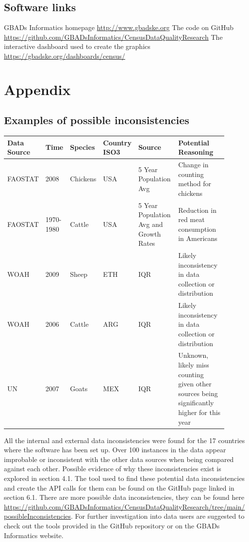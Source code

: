 \documentclass{article}
\begin{document}
\subsection{Software links}
GBADs Informatics homepage \url{http://www.gbadske.org}
\newline
The code on GitHub \url{https://github.com/GBADsInformatics/CensusDataQualityResearch}
\newline
The interactive dashboard used to create the graphics
\url{https://gbadske.org/dashboards/census/}

\section{Appendix}
\subsection{Examples of possible inconsistencies}
\begin{center}
\begin{longtable}[c]{| p{0.1\linewidth} | | p{0.1\linewidth} | | p{0.1\linewidth} | | p{0.1\linewidth} | | p{0.2\linewidth} | | p{0.3\linewidth} |}
\hline
Data Source & Time & Species & Country ISO3 & Source & Potential Reasoning\\
\hline
\endfirsthead

FAOSTAT & 2008          & Chickens  & USA & 5 Year Population Avg & Change in counting method for chickens \\
FAOSTAT & 1970-1980     & Cattle    & USA & 5 Year Population Avg and Growth Rates & Reduction in red meat consumption in Americans \\
WOAH    & 2009          & Sheep     & ETH & IQR & Likely inconsistency in data collection or distribution \\
WOAH    & 2006          & Cattle    & ARG & IQR & Likely inconsistency in data collection or distribution \\
UN      & 2007          & Goats     & MEX & IQR & Unknown, likely miss counting given other sources being significantly higher for this year \\

\hline
\end{longtable}
\end{center}

All the internal and external data inconsistencies were found for the 17 countries where the software has been set up. Over 100 instances in the data appear improbable or inconsistent with the other data sources when being compared against each other. Possible evidence of why these inconsistencies exist is explored in section 4.1. The tool used to find these potential data inconsistencies and create the API calls for them can be found on the GitHub page linked in section 6.1. There are more possible data inconsistencies, they can be found here \url{https://github.com/GBADsInformatics/CensusDataQualityResearch/tree/main/possibleInconsistencies}. For further investigation into data users are suggested to check out the tools provided in the GitHub repository or on the GBADs Informatics website. 



\end{document}
